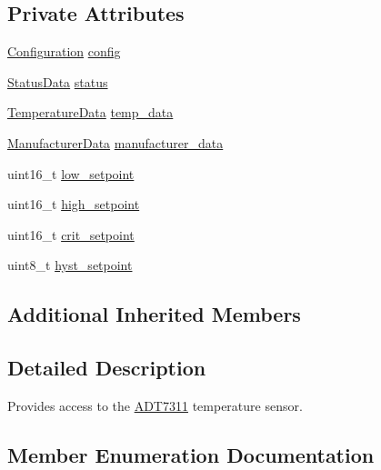 \subsection*{Private Attributes}
\begin{DoxyCompactItemize}
\item 
\hyperlink{unioncubesat_1_1ADT7311_1_1Configuration}{Configuration} \hyperlink{classcubesat_1_1ADT7311_aa14e2538b100b5427358cf21fff183e6}{config}
\item 
\hyperlink{unioncubesat_1_1ADT7311_1_1StatusData}{Status\+Data} \hyperlink{classcubesat_1_1ADT7311_a4d64ee91316d0a3f44384f57bee01d17}{status}
\item 
\hyperlink{unioncubesat_1_1ADT7311_1_1TemperatureData}{Temperature\+Data} \hyperlink{classcubesat_1_1ADT7311_a8045af6862135c6796ea97b95e431705}{temp\+\_\+data}
\item 
\hyperlink{unioncubesat_1_1ADT7311_1_1ManufacturerData}{Manufacturer\+Data} \hyperlink{classcubesat_1_1ADT7311_adca4665892622e13f6dc7405528697d6}{manufacturer\+\_\+data}
\item 
uint16\+\_\+t \hyperlink{classcubesat_1_1ADT7311_a5239e3277f763a5d9cbdda84fc6476b1}{low\+\_\+setpoint}
\item 
uint16\+\_\+t \hyperlink{classcubesat_1_1ADT7311_a24bf458335fd8dce02f43f0d66ec323a}{high\+\_\+setpoint}
\item 
uint16\+\_\+t \hyperlink{classcubesat_1_1ADT7311_ab79d199972c7f14cab10015034cf6b52}{crit\+\_\+setpoint}
\item 
uint8\+\_\+t \hyperlink{classcubesat_1_1ADT7311_a486d810e54eae5c266a2c640725a4885}{hyst\+\_\+setpoint}
\end{DoxyCompactItemize}
\subsection*{Additional Inherited Members}


\subsection{Detailed Description}
Provides access to the \hyperlink{classcubesat_1_1ADT7311}{A\+D\+T7311} temperature sensor. 

\subsection{Member Enumeration Documentation}
\mbox{\label{classcubesat_1_1ADT7311_a4a6cb79b6b3ec095455c94b20c9ca59e}} 
